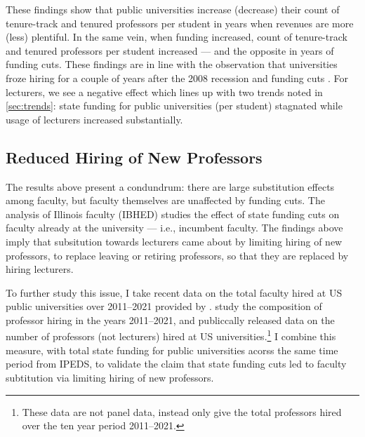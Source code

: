 These findings show that public universities increase (decrease) their count of tenure-track and tenured professors per student in years when revenues are more (less) plentiful.
In the same vein, when funding increased, count of tenure-track and tenured professors per student increased --- and the opposite in years of funding cuts.
These findings are in line with the observation that universities froze hiring for a couple of years after the 2008 recession and funding cuts \citep{turner2014impact}.
For lecturers, we see a negative effect which lines up with two trends noted in \autoref{sec:trends}: state funding for public universities (per student) stagnated while usage of lecturers increased substantially.


\subsection{Reduced Hiring of New Professors}
The results above present a condundrum: there are large substitution effects among faculty, but faculty themselves are unaffected by funding cuts.
The analysis of Illinois faculty (IBHED) studies the effect of state funding cuts on faculty already at the university --- i.e., incumbent faculty.
The findings above imply that subsitution towards lecturers came about by limiting hiring of new professors, to replace leaving or retiring professors, so that they are replaced by hiring lecturers.



To further study this issue, I take recent data on the total faculty hired at US public universities over 2011--2021 provided by \cite{wapman2022quantifying,wapman2022zenodo}.
\cite{wapman2022quantifying} study the composition of professor hiring in the years 2011--2021, and publiccally released data on the number of professors (not lecturers) hired at US universities.\footnote{
    These data are not panel data, instead only give the total professors hired over the ten year period 2011--2021.
}
I combine this measure, with total state funding for public universities acorss the same time period from IPEDS, to validate the claim that state funding cuts led to faculty subtitution via limiting hiring of new professors.

